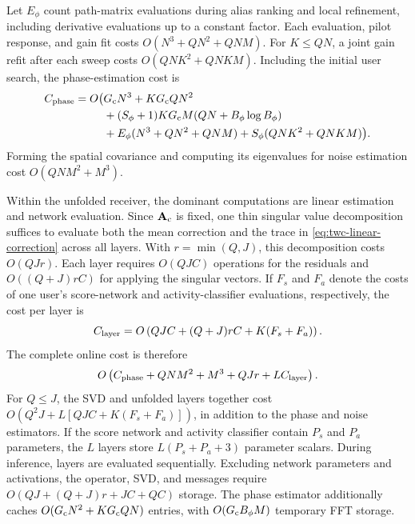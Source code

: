 Let $E_\phi$ count path-matrix evaluations during alias ranking and
local refinement, including derivative evaluations up to a constant
factor. Each evaluation, pilot response, and gain fit costs
$O(N^3+QN^2+QNM)$. For $K\leq QN$, a joint gain refit after each
sweep costs $O(QNK^2+QNKM)$. Including the initial user search,
the phase-estimation cost is
\begin{equation}
 \begin{aligned}
 C_{\rm phase}=O\big(&G_{\rm c}N^3+KG_{\rm c}QN^2\\
 &+(S_\phi+1)KG_{\rm c}M(QN+B_\phi\log B_\phi)\\
 &+E_\phi(N^3+QN^2+QNM)+S_\phi(QNK^2+QNKM)\big).
 \end{aligned}
 \label{eq:twc-phase-complexity}
\end{equation}
Forming the spatial covariance and computing its eigenvalues for
noise estimation cost $O(QNM^2+M^3)$.

Within the unfolded receiver, the dominant computations are linear
estimation and network evaluation.
Since $\mathbf A_{\rm c}$ is fixed, one thin singular
value decomposition suffices to evaluate both the mean correction
and the trace in \eqref{eq:twc-linear-correction} across all layers.
With $r=\min(Q,J)$, this decomposition costs $O(QJr)$.
Each layer requires $O(QJC)$ operations for the residuals and
$O((Q+J)rC)$ for applying the singular vectors. If $F_s$ and $F_a$
denote the costs of one user's score-network and activity-classifier
evaluations, respectively, the cost per layer is
\begin{equation}
 C_{\rm layer}=O\left(QJC+(Q+J)rC+K(F_s+F_a)\right).
 \label{eq:twc-layer-complexity}
\end{equation}
The complete online cost is therefore
\begin{equation}
 O\left(C_{\rm phase}+QNM^2+M^3+QJr+L C_{\rm layer}\right).
 \label{eq:twc-complexity}
\end{equation}
For $Q\leq J$, the SVD and unfolded layers together cost
$O(Q^2J+L[QJC+K(F_s+F_a)])$, in addition to the phase and noise
estimators.
If the score network and activity classifier contain $P_s$ and $P_a$
parameters, the $L$ layers store $L(P_s+P_a+3)$ parameter scalars.
During inference, layers are evaluated sequentially. Excluding network
parameters and activations, the operator, SVD, and messages require
$O(QJ+(Q+J)r+JC+QC)$ storage. The phase estimator additionally
caches $O(G_{\rm c}N^2+KG_{\rm c}QN)$ entries, with
$O(G_{\rm c}B_\phi M)$ temporary FFT storage.
